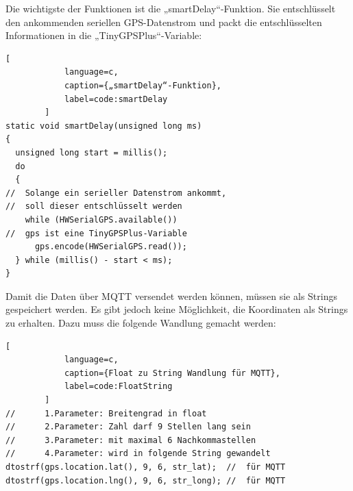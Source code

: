         
        
        
        Die wichtigste der Funktionen ist die „smartDelay“-Funktion. Sie entschlüsselt den ankommenden seriellen GPS-Datenstrom und packt die entschlüsselten Informationen in die „TinyGPSPlus“-Variable:
        
        \begin{lstlisting}[
            language=c,
            caption={„smartDelay“-Funktion},
            label=code:smartDelay
        ]
static void smartDelay(unsigned long ms)
{
  unsigned long start = millis();
  do
  {
//  Solange ein serieller Datenstrom ankommt, 
//  soll dieser entschlüsselt werden
    while (HWSerialGPS.available())
//  gps ist eine TinyGPSPlus-Variable
      gps.encode(HWSerialGPS.read());
  } while (millis() - start < ms);
}
        \end{lstlisting}
        
        
        
        Damit die Daten über MQTT versendet werden können, müssen sie als Strings gespeichert werden. Es gibt jedoch keine Möglichkeit, die Koordinaten als Strings zu erhalten. Dazu muss die folgende Wandlung gemacht werden: 
  
        \begin{lstlisting}[
            language=c,
            caption={Float zu String Wandlung für MQTT},
            label=code:FloatString
        ]
//      1.Parameter: Breitengrad in float               
//      2.Parameter: Zahl darf 9 Stellen lang sein 
//      3.Parameter: mit maximal 6 Nachkommastellen     
//      4.Parameter: wird in folgende String gewandelt 
dtostrf(gps.location.lat(), 9, 6, str_lat);  //  für MQTT 
dtostrf(gps.location.lng(), 9, 6, str_long); //  für MQTT
        \end{lstlisting}

